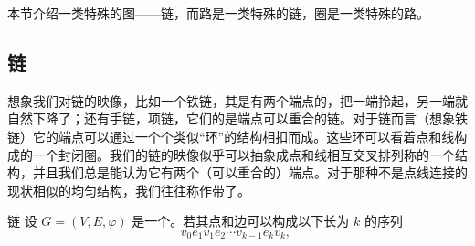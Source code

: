 
本节介绍一类特殊的图——链，而路是一类特殊的链，圈是一类特殊的路。

\subsection{链}
想象我们对链的映像，比如一个铁链，其是有两个端点的，把一端拎起，另一端就自然下降了；还有手链，项链，它们的是端点可以重合的链。对于链而言（想象铁链）它的端点可以通过一个个类似“环”的结构相扣而成。这些环可以看着点和线构成的一个封闭圈。我们的链的映像似乎可以抽象成点和线相互交叉排列称的一个结构，并且我们总是能认为它有两个（可以重合的）端点。对于那种不是点线连接的现状相似的均匀结构，我们往往称作带了。

\begin{definition}{链}
设 $G=(V,E,\varphi)$ 是一个。若其点和边可以构成以下长为 $k$ 的序列
\begin{equation}
v_0 e_1v_1e_2\cdots v_{k-1} e_kv_k,~
\end{equation}

\end{definition}














